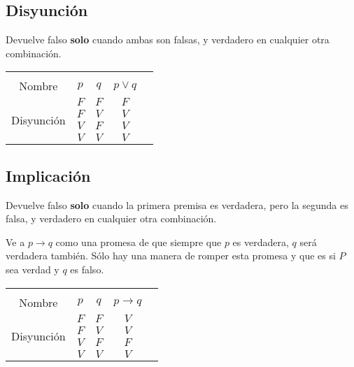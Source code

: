 \documentclass[12pt]{report}                                    %
\begin{document}
        \subsection{Disyunción}

            Devuelve falso \textbf{solo} cuando ambas son falsas, y verdadero en cualquier
            otra combinación.\\

            \begin{tabular}{ |c|c|c|c|c| } 
                \hline &&&\\
                \large{Nombre} & $p$ & $q$ & $p \lor q$ \\[0.5em]
                \hline
                \multirow{4}{5em}{Disyunción}
                & $F$ & $F$ & $F$ \\ \cline{2-4}
                & $F$ & $V$ & $V$ \\ \cline{2-4}
                & $V$ & $F$ & $V$ \\ \cline{2-4}
                & $V$ & $V$ & $V$ \\ 
                \hline
            \end{tabular}





        \clearpage
        \subsection{Implicación}

            Devuelve falso \textbf{solo} cuando la primera premisa es verdadera, pero la 
            segunda es falsa, y verdadero en cualquier otra combinación.

            Ve a $p \to q$ como una promesa de que siempre que $p$ es verdadera, $q$ será verdadera también.
            Sólo hay una manera de romper esta promesa y que es si $P$ sea verdad y $q$ es falso.\\


            \begin{tabular}{ |c|c|c|c|c| } 
                \hline &&&\\
                \large{Nombre} & $p$ & $q$ & $p \to q$ \\[0.5em]
                \hline
                \multirow{4}{5em}{Disyunción}
                & $F$ & $F$ & $V$ \\ \cline{2-4}
                & $F$ & $V$ & $V$ \\ \cline{2-4}
                & $V$ & $F$ & $F$ \\ \cline{2-4}
                & $V$ & $V$ & $V$ \\ 
                \hline
            \end{tabular}\\[1.0em]
\end{document}

